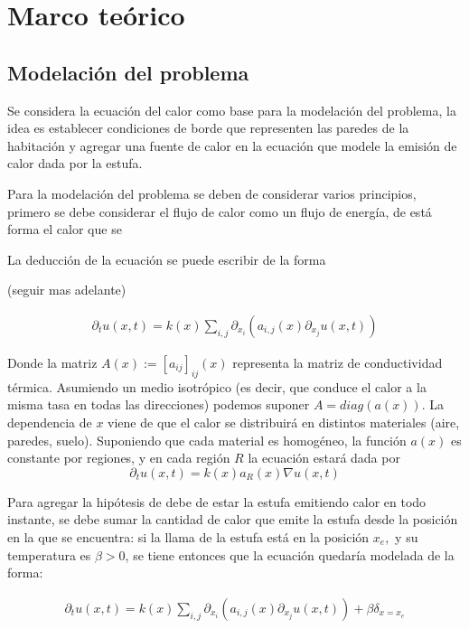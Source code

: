 \documentclass[12pt,paperletter]{article}
\begin{document}
\newpage
\section{Marco teórico}

\subsection{Modelación del problema}
Se considera la ecuación del calor como base para la modelación del problema, la idea es establecer condiciones de borde que representen las paredes de la habitación y agregar una fuente de calor en la ecuación que modele la emisión de calor dada por la estufa. 

Para la modelación del problema se deben de considerar varios principios, primero se debe considerar el flujo de calor como un flujo de energía, de está forma el calor que se 


La deducción de la ecuación se puede escribir de la forma 

(seguir mas adelante)

\begin{align}
    \partial_t u(x,t) = k(x) \sum_{i,j} \partial_{x_i} (a_{i,j} (x) \partial_{x_j} u(x,t) )
\end{align}

Donde la matriz $A(x):= [a_{ij}]_{ij}(x)$ representa la matriz de conductividad térmica. Asumiendo un medio isotrópico (es decir, que conduce el calor a la misma tasa en todas las direcciones) podemos suponer $A = diag(a(x))$. La dependencia de $x$ viene de que el calor se distribuirá en distintos materiales (aire, paredes, suelo). Suponiendo que cada material es homogéneo, la función $a(x)$ es constante por regiones, y en cada región $R$ la ecuación estará dada por
$$\partial_t u(x,t) = k(x) a_R(x) \nabla u(x,t) $$

Para agregar la hipótesis de debe de estar la estufa emitiendo calor en todo instante, se debe sumar la cantidad de calor que emite la estufa desde la posición en la que se encuentra: si la llama de la estufa está en la posición $x_e,$ y su temperatura es $\beta >0$, se tiene entonces que la ecuación quedaría modelada de la forma:

\begin{align}
    \partial_t u(x,t) = k(x) \sum_{i,j} \partial_{x_i} (a_{i,j} (x) \partial_{x_j} u(x,t) ) + \beta \delta_{x = x_e}
\end{align}
\end{document}
